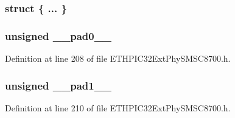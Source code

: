\hypertarget{union_____p_h_y_c_t_r_lbits__t_a02c148dd3479cbbf865c4e93b3c9e199}{}\subsubsection[{"@270}]{\setlength{\rightskip}{0pt plus 5cm}struct \{ ... \} }\label{union_____p_h_y_c_t_r_lbits__t_a02c148dd3479cbbf865c4e93b3c9e199}
\hypertarget{union_____p_h_y_c_t_r_lbits__t_adf71f3d8410c1f1dbbc96680a92c49af}{}
\subsubsection[{\+\_\+\+\_\+pad0\+\_\+\+\_\+}]{\setlength{\rightskip}{0pt plus 5cm}unsigned \+\_\+\+\_\+pad0\+\_\+\+\_\+}\label{union_____p_h_y_c_t_r_lbits__t_adf71f3d8410c1f1dbbc96680a92c49af}


Definition at line 208 of file E\+T\+H\+P\+I\+C32\+Ext\+Phy\+S\+M\+S\+C8700.\+h.

\hypertarget{union_____p_h_y_c_t_r_lbits__t_acaf2d0924a107ec6e8d2e31febaf66f9}{}
\subsubsection[{\+\_\+\+\_\+pad1\+\_\+\+\_\+}]{\setlength{\rightskip}{0pt plus 5cm}unsigned \+\_\+\+\_\+pad1\+\_\+\+\_\+}\label{union_____p_h_y_c_t_r_lbits__t_acaf2d0924a107ec6e8d2e31febaf66f9}


Definition at line 210 of file E\+T\+H\+P\+I\+C32\+Ext\+Phy\+S\+M\+S\+C8700.\+h.

\hypertarget{union_____p_h_y_c_t_r_lbits__t_a4d97cc5f7d51d22fc2bf3eab35c9cb7f}{}
